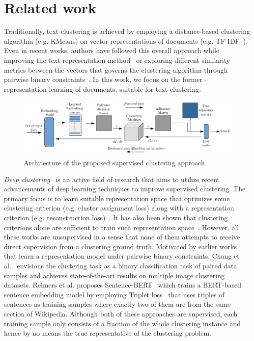\documentclass[11pt,a4paper]{article}
\begin{document}
\section{Related work}
Traditionally, text clustering is achieved by employing a distance-based clustering algorithm (e.g. KMeans) on vector representations of documents (e.g. TF-IDF~\cite{jones1972statistical}). Even in recent works, authors have followed this overall approach while improving the text representation method~\cite{chen2017improved,xu2017self,hadifar2019self} or exploring different similarity metrics between the vectors that governs the clustering algorithm through pairwise binary constraints~\cite{basu2002semi,kulis2009semi}. In this work, we focus on the former - representation learning of documents, suitable for text clustering.

\begin{figure}
    \centering
    \includegraphics[scale=0.58]{acl-ijcnlp2021-templates/bbcluster_arch.png}
    \caption{Architecture of the proposed supervised clustering approach}
    \label{fig:bbc_arch}
\end{figure}

\textit{Deep clustering}~\cite{min2018survey} is an active field of research that aims to utilize recent advancements of deep learning techniques to improve supervised clustering. The primary focus is to learn suitable representation space that optimizes some clustering criterion (e.g. cluster assignment loss) along with a representation criterion (e.g. reconstruction loss)~\cite{xie2016unsupervised,li2018discriminatively,ghasedi2017deep,jiang2016variational}. It has also been shown that clustering criterions alone are sufficient to train such representation space~\cite{yang2016joint}. However, all these works are unsupervised in a sense that none of them attempts to receive direct supervision from a clustering ground truth. Motivated by earlier works that learn a representation model under pairwise binary constraints, Chang et al.~\cite{chang2017deep} envisions the clustering task as a binary classification task of paired data samples and achieves state-of-the-art results on multiple image clustering datasets. Reimers et al. proposes Sentence-BERT~\cite{reimers2019sentence} which trains a BERT-based~\cite{devlin2018bert} sentence embedding model by employing Triplet loss~\cite{dor2018learning} that uses triples of sentences as training samples where exactly two of them are from the same section of Wikipedia. Although both of these approaches are supervised, each training sample only consists of a fraction of the whole clustering instance and hence by no means the true representative of the clustering problem.
\end{document}
